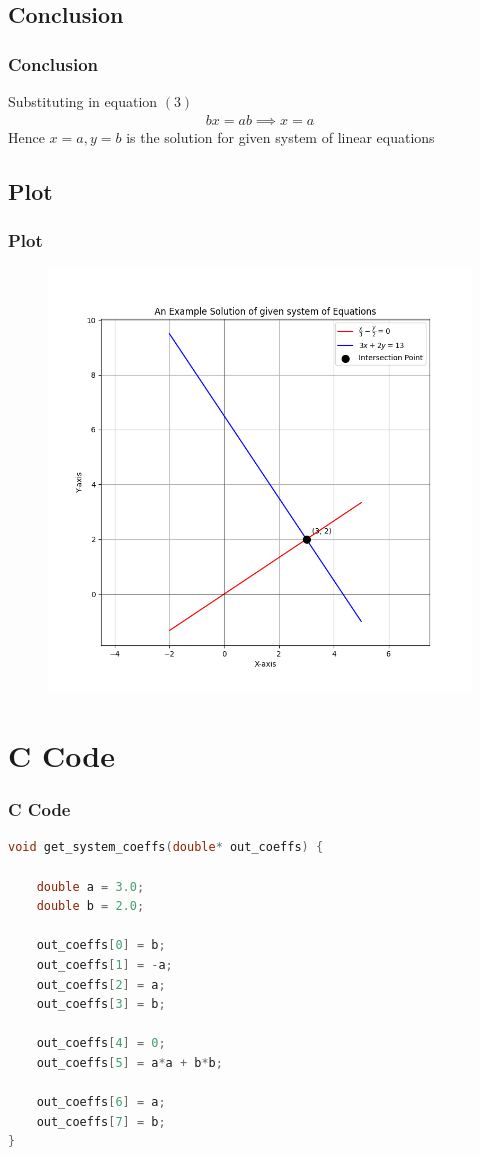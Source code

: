 \documentclass{beamer}
\providecommand{\brak}[1]{\ensuremath{\left(#1\right)}}
\theoremstyle{remark}
\numberwithin{equation}{section}
\begin{document}
\subsection{Conclusion}
\begin{frame}
\frametitle{Conclusion}
Substituting in equation \brak{3}
 \begin{align}
     bx=ab \implies x=a
 \end{align}
 Hence $x=a,y=b$ is the solution for given system of linear equations
\end{frame}
\subsection{Plot}
\begin{frame}[fragile]
\frametitle{Plot}

\begin{figure}[h!]
   \centering
   \includegraphics[width=0.7\columnwidth]{figs/fig1.png}
	\caption{}
   \label{}
\end{figure}
\end{frame}

\section{C Code}
\begin{frame}[fragile]
\frametitle{C Code}
\begin{lstlisting}[language=C]
void get_system_coeffs(double* out_coeffs) {
 
    double a = 3.0;
    double b = 2.0;
   
    out_coeffs[0] = b;
    out_coeffs[1] = -a;
    out_coeffs[2] = a;
    out_coeffs[3] = b;
 
    out_coeffs[4] = 0;
    out_coeffs[5] = a*a + b*b;
 
    out_coeffs[6] = a;
    out_coeffs[7] = b;
}
    \end{lstlisting}
\end{frame}
\end{document}
